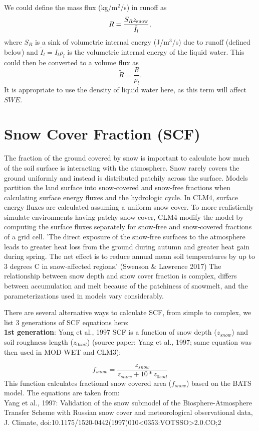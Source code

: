 \documentclass[twoside,10pt]{report}
\begin{document}
We could define the mass flux (kg/m$^2$/s) in runoff as
\begin{equation}
R = \frac{S_R z_{\rm snow}}{\tilde{I}_l},
\end{equation}
where $S_R$ is a sink of volumetric internal energy (J/m$^3$/s) due to runoff (defined below) and $\tilde{I}_l = I_l \rho_l$ is the volumetric internal energy of the liquid water. This could then be converted to a volume flux as
\begin{equation}
\tilde{R} = \frac{R}{\rho_l}.
\end{equation}
It is appropriate to use the density of liquid water here, as this term will affect $SWE$.


\section{Snow Cover Fraction (SCF)}\label{sec:scf}
The fraction of the ground covered by snow is important to calculate how much of the soil surface is interacting with the atmosphere. Snow rarely covers the ground uniformly and instead is distributed patchily across the surface. Models partition the land surface into snow-covered and snow-free fractions when calculating surface energy fluxes and the hydrologic cycle. 
In CLM4, surface energy fluxes are calculated assuming a uniform snow cover. To more realistically simulate environments having patchy snow cover, CLM4 modify the model by computing the surface fluxes separately for snow‐free and snow‐covered fractions of a grid cell. 'The direct exposure of the snow‐free surfaces to the atmosphere leads to greater heat loss from the ground during autumn and greater heat gain during spring. The net effect is to reduce annual mean soil temperatures by up to 3 degrees C in snow‐affected regions.' (Swenson \& Lawrence 2017)
The relationship between snow depth and snow cover fraction is complex, differs between accumulation and melt because of the patchiness of snowmelt, and the parameterizations used in models vary considerably.

There are several alternative ways to calculate SCF, from simple to complex, we list 3 generations of SCF equations here:\\

\textbf{1st generation}: Yang et al., 1997 SCF is a function of snow depth ($z_{snow}$) and soil roughness length ($z_{0soil}$) (source paper: Yang et al., 1997; same equation was then used in MOD-WET and CLM3):

\begin{equation}
f_{snow}= \frac{z_{snow}}{z_{snow}+10*z_{0soil}}
\end{equation}This function calculates fractional snow covered area ($f_{snow}$) based on the BATS model. The equations are taken from: \\
Yang et al., 1997: Validation of the snow submodel of the Biosphere-Atmosphere Transfer Scheme with Russian snow cover and meteorological observational data, J. Climate, doi:10.1175/1520-0442(1997)010<0353:VOTSSO>2.0.CO;2\\
\end{document}

